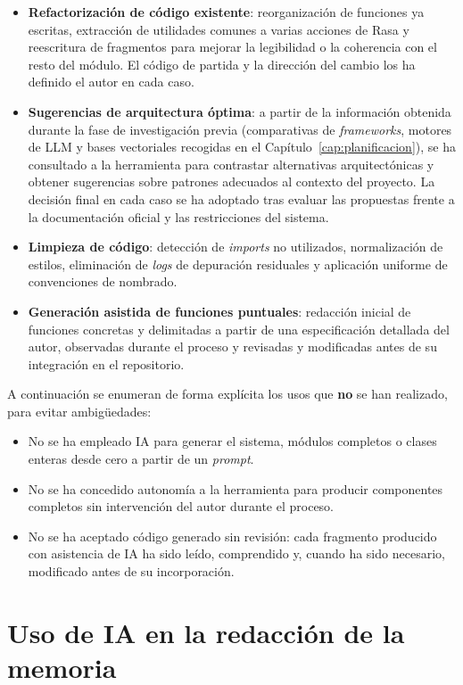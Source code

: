 \begin{itemize}
    \item \textbf{Refactorización de código existente}: reorganización de funciones ya escritas, extracción de utilidades comunes a varias acciones de Rasa y reescritura de fragmentos para mejorar la legibilidad o la coherencia con el resto del módulo. El código de partida y la dirección del cambio los ha definido el autor en cada caso.
    \item \textbf{Sugerencias de arquitectura óptima}: a partir de la información obtenida durante la fase de investigación previa (comparativas de \textit{frameworks}, motores de LLM y bases vectoriales recogidas en el Capítulo~\ref{cap:planificacion}), se ha consultado a la herramienta para contrastar alternativas arquitectónicas y obtener sugerencias sobre patrones adecuados al contexto del proyecto. La decisión final en cada caso se ha adoptado tras evaluar las propuestas frente a la documentación oficial y las restricciones del sistema.
    \item \textbf{Limpieza de código}: detección de \textit{imports} no utilizados, normalización de estilos, eliminación de \textit{logs} de depuración residuales y aplicación uniforme de convenciones de nombrado.
    \item \textbf{Generación asistida de funciones puntuales}: redacción inicial de funciones concretas y delimitadas a partir de una especificación detallada del autor, observadas durante el proceso y revisadas y modificadas antes de su integración en el repositorio.
\end{itemize}

A continuación se enumeran de forma explícita los usos que \textbf{no} se han realizado, para evitar ambigüedades:

\begin{itemize}
    \item No se ha empleado IA para generar el sistema, módulos completos o clases enteras desde cero a partir de un \textit{prompt}.
    \item No se ha concedido autonomía a la herramienta para producir componentes completos sin intervención del autor durante el proceso.
    \item No se ha aceptado código generado sin revisión: cada fragmento producido con asistencia de IA ha sido leído, comprendido y, cuando ha sido necesario, modificado antes de su incorporación.
\end{itemize}

\section{Uso de IA en la redacción de la memoria}\label{sec:ia-memoria}

